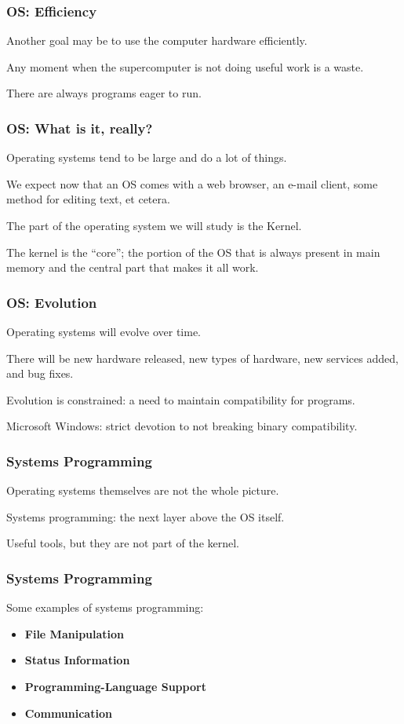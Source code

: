 \begin{frame}
\frametitle{OS: Efficiency}
Another goal may be to use the computer hardware efficiently.

Any moment when the supercomputer is not doing useful work is a waste.

There are always programs eager to run.

\end{frame}

\begin{frame}
\frametitle{OS: What is it, really?}

Operating systems tend to be large and do a lot of things. 

We expect now that an OS comes with a web browser, an e-mail client, some method for editing text, et cetera. 

The part of the operating system we will study is the \alert{Kernel}.

The kernel is the ``core''; the portion of the OS that is always present in main memory and the central part that makes it all work.

\end{frame}

\begin{frame}
\frametitle{OS: Evolution}
Operating systems will evolve over time. 

There will be new hardware released, new types of hardware, new services added, and bug fixes. 

Evolution is constrained: a need to maintain compatibility for programs. 

Microsoft Windows: strict devotion to not breaking binary compatibility.

\end{frame}

\begin{frame}
\frametitle{Systems Programming}
Operating systems themselves are not the whole picture.

Systems programming: the next layer above the OS itself.

Useful tools, but they are not part of the kernel. 

\end{frame}

\begin{frame}
\frametitle{Systems Programming}

Some examples of systems programming:

\begin{itemize}
	\item \textbf{File Manipulation}
	\item \textbf{Status Information}
	\item \textbf{Programming-Language Support}
	\item \textbf{Communication}
\end{itemize}

\end{frame}

